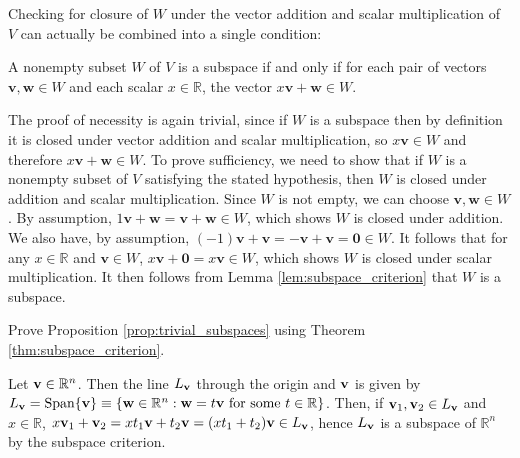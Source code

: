 \documentclass[12pt,letterpaper,reqno]{article}
\numberwithin{equation}{section}
\newcommand{\fixme}[1]{{\color{orange}{[#1]}}}
\begin{document}
Checking for closure of $W$ under the vector addition and scalar multiplication of $V$ can actually be combined into a single condition:

\begin{thm}\label{thm:subspace_criterion}
A nonempty subset $W$ of $V$ is a subspace if and only if for each pair of vectors $\mathbf{v},\mathbf{w} \in W$ and each scalar $x \in \mathbb{R}$, the vector $x\mathbf{v}+\mathbf{w} \in W$.	
\end{thm}

\begin{pf}
The proof of necessity is again trivial, since if $W$ is a subspace then by definition it is closed under vector addition and scalar multiplication, so $x\mathbf{v} \in W$ and therefore $x\mathbf{v}+\mathbf{w} \in W$. To prove sufficiency, we need to show that if $W$ is a nonempty subset of $V$ satisfying the stated hypothesis, then $W$ is closed under addition and scalar multiplication. Since $W$ is not empty, we can choose $\mathbf{v}, \mathbf{w} \in W$. By assumption, $1\mathbf{v}+\mathbf{w}=\mathbf{v}+\mathbf{w} \in W$, which shows $W$ is closed under addition. We also have, by assumption, $(-1)\mathbf{v}+\mathbf{v}=-\mathbf{v}+\mathbf{v}=\mathbf{0} \in W$. It follows that for any $x \in \mathbb{R}$ and $\mathbf{v} \in W$, $x\mathbf{v}+\mathbf{0}=x\mathbf{v}\in W$, which shows $W$ is closed under scalar multiplication. It then follows from Lemma \ref{lem:subspace_criterion} that $W$ is a subspace.	
\end{pf}

\begin{exercise}
	Prove Proposition \ref{prop:trivial_subspaces} using Theorem \ref{thm:subspace_criterion}.
\end{exercise}


\begin{example}
	Let ${\bf v} \in \mathbb{R}^n$. Then the line $L_{\bf v}$ through the origin and ${\bf v}$ is given by $L_{\bf v}=\text{Span}\{{\bf v}\}\equiv\{{\bf w} \in \mathbb{R}^n : {\bf w}=t{\bf v} \text{ for some } t \in \mathbb{R}\}$. Then, if ${\bf v}_1,{\bf v}_2 \in L_{\bf v}$ and $x \in \mathbb{R}$, $x{\bf v}_1+{\bf v}_2=xt_1{\bf v}+t_2{\bf v}=(xt_1+t_2){\bf v} \in L_{\bf v}$, hence $L_{\bf v}$ is a subspace of $\mathbb{R}^n$ by the subspace criterion. \fixme{We have not introduced the span of a set of vectors yet.}
\end{example}	
	
\end{document}
